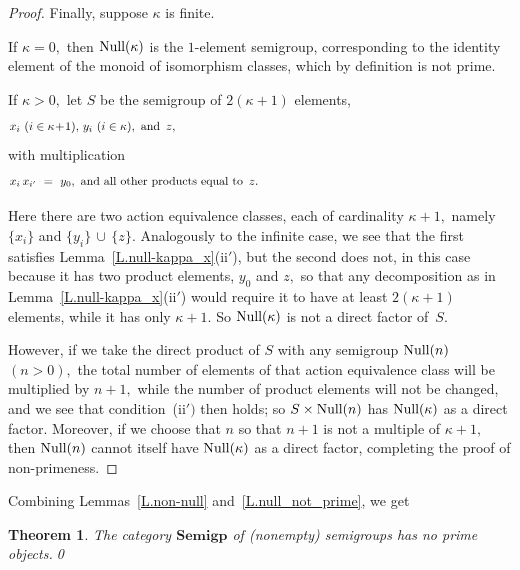 \documentclass{amsart}
\newtheorem{theorem}{Theorem}
\numberwithin{equation}{section}
\numberwithin{theorem}{section}
\begin{document}
\begin{proof}
Finally, suppose $\kappa$ is finite.

If $\kappa=0,$ then $\textup{Null}(\kappa)$ is the $\!1\!$-element
semigroup, corresponding to the identity element of the monoid of
isomorphism classes, which by definition is not prime.

If $\kappa>0,$ let $S$ be the semigroup of $2(\kappa\!+\!1)$ elements,
%
\begin{equation}\begin{minipage}[c]{35pc}\label{d.xiyiz}
$x_i$ $(i\in\kappa\!+\!1),$ $y_i$ $(i\in\kappa),$ \,and\, $z,$
\end{minipage}\end{equation}
%
with multiplication
%
\begin{equation}\begin{minipage}[c]{35pc}\label{d.x-eq-cl-fin}
$x_i\,x_{i'}~=~y_0,\,$ and all other products equal to\, $z.$
\end{minipage}\end{equation}

Here there are two action equivalence classes, each of
cardinality $\kappa\!+\!1,$ namely $\{x_i\}$ and $\{y_i\}\,\cup\,\{z\}.$
Analogously to the infinite case, we see that
the first satisfies Lemma~\ref{L.null-kappa_x}(ii\!$'$\!),
but the second does not, in this case because it has two
product elements, $y_0$ and $z,$ so that any decomposition as in
Lemma~\ref{L.null-kappa_x}(ii\!$'$\!) would require it to have at least
$2(\kappa\!+\!1)$ elements, while it has only $\kappa\!+\!1.$
So $\textup{Null}(\kappa)$ is not a direct factor of~$S.$

However, if we take the direct product of $S$ with any semigroup
$\textup{Null}(n)$ $(n>0),$ the total number of elements of that
action equivalence class will be multiplied by $n+1,$ while the number
of product elements will not be changed, and we see that
condition~(ii$\!')$ then holds; so $S\times\textup{Null}(n)$
has $\textup{Null}(\kappa)$ as a direct factor.
Moreover, if we choose that $n$ so that $n\!+\!1$ is not a multiple
of $\kappa\!+\!1,$ then $\textup{Null}(n)$ cannot itself have
$\textup{Null}(\kappa)$ as a direct factor, completing the
proof of non-primeness.
\end{proof}

Combining Lemmas~\ref{L.non-null} and~\ref{L.null_not_prime}, we get

\begin{theorem}\label{T.no_primes}
The category $\mathbf{Semigp}$ of \textup{(}nonempty\textup{)}
semigroups has no prime objects.\qed
\end{theorem}
\end{document}
